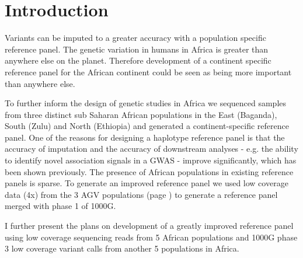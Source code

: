 \section{Introduction}
\label{sec:rp_introduction}

Variants can be imputed to a greater accuracy with a population specific reference panel.\cite{Jallow2009} The genetic variation in humans in Africa is greater than anywhere else on the planet.\cite{Gurdasani2015} Therefore development of a continent specific reference panel for the African continent could be seen as being more important than anywhere else.

To further inform the design of genetic studies in Africa we sequenced samples from three distinct sub Saharan African populations in the East (Baganda), South (Zulu) and North (Ethiopia) and generated a continent-specific reference panel. One of the reasons for designing a haplotype reference panel is that the accuracy of imputation and the accuracy of downstream analyses - e.g. the ability to identify novel association signals in a \gls{GWAS} - improve significantly, which has been shown previously.\cite{Jallow2009}\cite{Gurdasani2015} The presence of African populations in existing reference panels is sparse. To generate an improved reference panel we used low coverage data (4x) from the 3 \gls{AGV} populations (page \pageref{sec:agv_data_description}) to generate a reference panel merged with phase 1 of \gls{1000G}.\cite{1000G2012}

I further present the plans on development of a greatly improved reference panel using low coverage sequencing reads from 5 African populations and \gls{1000G} phase 3\cite{1000G2015} low coverage variant calls from another 5 populations in Africa.